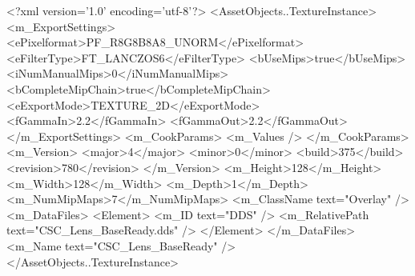 <?xml version='1.0' encoding='utf-8'?>
<AssetObjects..TextureInstance>
  <m_ExportSettings>
    <ePixelformat>PF_R8G8B8A8_UNORM</ePixelformat>
    <eFilterType>FT_LANCZOS6</eFilterType>
    <bUseMips>true</bUseMips>
    <iNumManualMips>0</iNumManualMips>
    <bCompleteMipChain>true</bCompleteMipChain>
    <eExportMode>TEXTURE_2D</eExportMode>
    <fGammaIn>2.2</fGammaIn>
    <fGammaOut>2.2</fGammaOut>
  </m_ExportSettings>
  <m_CookParams>
    <m_Values />
  </m_CookParams>
  <m_Version>
    <major>4</major>
    <minor>0</minor>
    <build>375</build>
    <revision>780</revision>
  </m_Version>
  <m_Height>128</m_Height>
  <m_Width>128</m_Width>
  <m_Depth>1</m_Depth>
  <m_NumMipMaps>7</m_NumMipMaps>
  <m_ClassName text="Overlay" />
  <m_DataFiles>
    <Element>
      <m_ID text="DDS" />
      <m_RelativePath text="CSC_Lens_BaseReady.dds" />
    </Element>
  </m_DataFiles>
  <m_Name text="CSC_Lens_BaseReady" />
</AssetObjects..TextureInstance>
